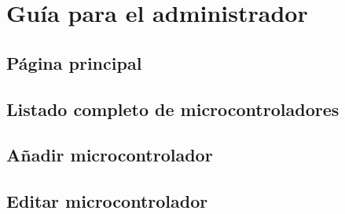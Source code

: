 \documentclass[11pt,spanish]{article}
\begin{document}
\newpage
\section{Guía para el administrador}


\subsection{Página principal}


\subsection{Listado completo de microcontroladores}


\subsection{Añadir microcontrolador}


\subsection{Editar microcontrolador}

\end{document}
